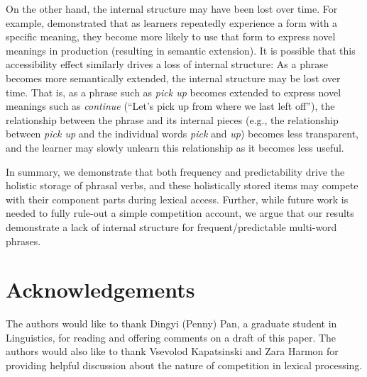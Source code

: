 \documentclass[
  authoryear,
  preprint,
  1p,
  onecolumn]{elsarticle}
\begin{document}
On the other hand, the internal structure may have been lost over time.
For example, \citet{harmonPuttingOldTools2017} demonstrated that as
learners repeatedly experience a form with a specific meaning, they
become more likely to use that form to express novel meanings in
production (resulting in semantic extension). It is possible that this
accessibility effect similarly drives a loss of internal structure: As a
phrase becomes more semantically extended, the internal structure may be
lost over time. That is, as a phrase such as \emph{pick up} becomes
extended to express novel meanings such as \emph{continue} (``Let's pick
up from where we last left off''), the relationship between the phrase
and its internal pieces (e.g., the relationship between \emph{pick up}
and the individual words \emph{pick} and \emph{up}) becomes less
transparent, and the learner may slowly unlearn this relationship as it
becomes less useful.

In summary, we demonstrate that both frequency and predictability drive
the holistic storage of phrasal verbs, and these holistically stored
items may compete with their component parts during lexical access.
Further, while future work is needed to fully rule-out a simple
competition account, we argue that our results demonstrate a lack of
internal structure for frequent/predictable multi-word phrases.

\section{Acknowledgements}\label{acknowledgements}

The authors would like to thank Dingyi (Penny) Pan, a graduate student
in Linguistics, for reading and offering comments on a draft of this
paper. The authors would also like to thank Vsevolod Kapatsinski and
Zara Harmon for providing helpful discussion about the nature of
competition in lexical processing.

\newpage


  
\end{document}
